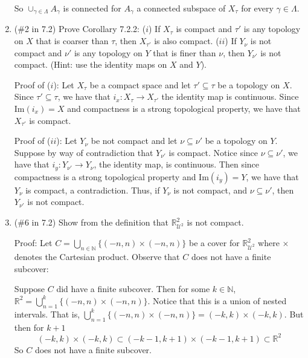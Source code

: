 \documentclass[12pt]{article}
\begin{document}
\begin{enumerate}
 So $\cup_{\gamma \in \Lambda} A_{\gamma}$ is connected for $A_{\gamma}$ a connected subspace of $X_{\tau}$ for every $\gamma \in \Lambda$.
 \newline
 
\item (\#2 in 7.2) Prove Corollary 7.2.2: ($i$) If $X_{\tau}$ is compact and $\tau'$ is any topology on $X$ that is coarser than $\tau$, then $X_{\tau'}$ is also compact. ($ii$) If $Y_{\nu}$ is not compact and $\nu'$ is any topology on $Y$ that is finer than $\nu$, then $Y_{\nu'}$ is not compact. (Hint: use the identity maps on $X$ and $Y$).



Proof of ($i$): Let $X_{\tau}$ be a compact space and let $\tau' \subseteq \tau$ be a topology on $X$. Since $\tau' \subseteq \tau$, we have that $i_x : X_{\tau} \to X_{\tau'}$ the identity map is continuous. Since $\text{Im}(i_x) = X$ and compactness is a strong topological property, we have that $X_{\tau'}$ is compact.
\newline

Proof of ($ii$): Let $Y_{\nu}$ be not compact and let $\nu \subseteq \nu'$ be a topology on $Y$. Suppose by way of contradiction that $Y_{\nu'}$ is compact. Notice since $\nu \subseteq \nu'$, we have that $i_y : Y_{\nu'} \to Y_{\nu}$, the identity map, is continuous. 
Then since compactness is a strong topological property and $\text{Im}(i_y) = Y$, we have that $Y_{\nu}$ is compact, a contradiction. Thus, if $Y_{\nu}$ is not compact, and $\nu \subseteq \nu'$, then $Y_{\nu'}$ is not compact.
\newline

\item (\#6 in 7.2) Show from the definition that $\mathbb{R}^2_{\mathcal{U}^2}$ is not compact.
\newline

Proof: Let $C = \bigcup_{n \in \mathbb{N}} \{(-n,n) \times (-n,n)\}$ be a cover for $\mathbb{R}^2_{\mathcal{U}^2}$ where $\times$ denotes the Cartesian product. Observe that $C$ does not have a finite subcover:

Suppose $C$ did have a finite subcover. Then for some $k \in \mathbb{N}$, $\mathbb{R}^2 = \bigcup_{n = 1}^k \{(-n, n) \times (-n, n)\}$. Notice that this is a union of nested intervals. That is, $\bigcup_{n = 1}^k \{(-n, n) \times (-n, n)\} = (-k,k) \times (-k,k)$. But then for $k + 1$  
\[(-k,k) \times (-k,k) \subset (-k - 1,k + 1) \times (-k -1, k+1) \subset \mathbb{R}^2\]
So $C$ does not have a finite subcover.


\end{enumerate}
\end{document}
